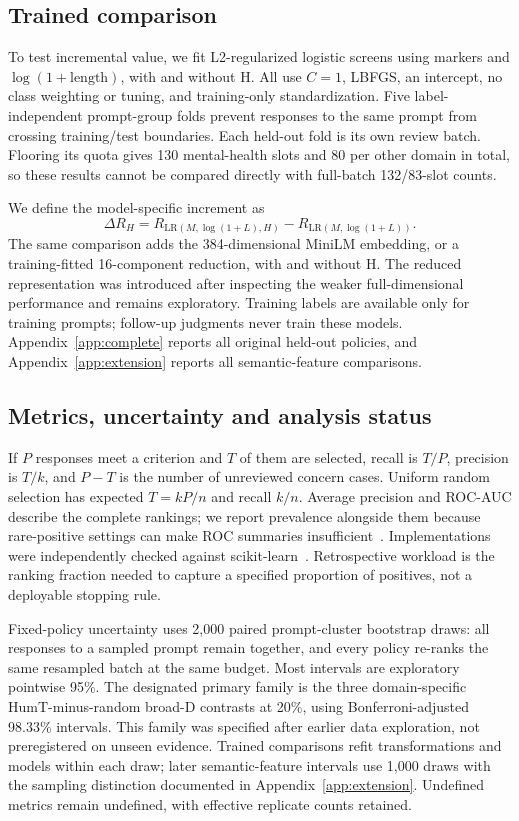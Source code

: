 \subsection{Trained comparison}\label{sec:heldout}
To test incremental value, we fit L2-regularized logistic screens using markers and $\log(1+\text{length})$, with and without H. All use $C=1$, LBFGS, an intercept, no class weighting or tuning, and training-only standardization. Five label-independent prompt-group folds prevent responses to the same prompt from crossing training/test boundaries. Each held-out fold is its own review batch. Flooring its quota gives 130 mental-health slots and 80 per other domain in total, so these results cannot be compared directly with full-batch 132/83-slot counts.

We define the model-specific increment as
\begin{equation}
\Delta R_H = R_{\mathrm{LR}(M,\log(1+L),H)}-R_{\mathrm{LR}(M,\log(1+L))}.
\end{equation}
The same comparison adds the 384-dimensional MiniLM embedding, or a training-fitted 16-component reduction, with and without H. The reduced representation was introduced after inspecting the weaker full-dimensional performance and remains exploratory. Training labels are available only for training prompts; follow-up judgments never train these models. Appendix~\ref{app:complete} reports all original held-out policies, and Appendix~\ref{app:extension} reports all semantic-feature comparisons.

\subsection{Metrics, uncertainty and analysis status}
If $P$ responses meet a criterion and $T$ of them are selected, recall is $T/P$, precision is $T/k$, and $P-T$ is the number of unreviewed concern cases. Uniform random selection has expected $T=kP/n$ and recall $k/n$. Average precision and ROC-AUC describe the complete rankings; we report prevalence alongside them because rare-positive settings can make ROC summaries insufficient~\cite{saito2015precision}. Implementations were independently checked against scikit-learn~\cite{pedregosa2011scikit}. Retrospective workload is the ranking fraction needed to capture a specified proportion of positives, not a deployable stopping rule.

Fixed-policy uncertainty uses 2,000 paired prompt-cluster bootstrap draws: all responses to a sampled prompt remain together, and every policy re-ranks the same resampled batch at the same budget. Most intervals are exploratory pointwise 95\%. The designated primary family is the three domain-specific HumT-minus-random broad-D contrasts at 20\%, using Bonferroni-adjusted 98.33\% intervals. This family was specified after earlier data exploration, not preregistered on unseen evidence. Trained comparisons refit transformations and models within each draw; later semantic-feature intervals use 1,000 draws with the sampling distinction documented in Appendix~\ref{app:extension}. Undefined metrics remain undefined, with effective replicate counts retained.

